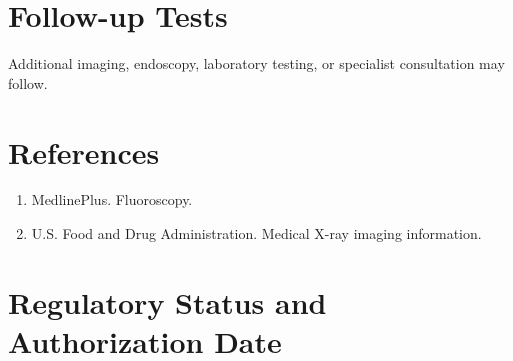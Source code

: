 \section*{Follow-up Tests} Additional imaging, endoscopy, laboratory testing, or specialist consultation may follow.
\section*{References} \begin{enumerate}\item MedlinePlus. Fluoroscopy.\item U.S. Food and Drug Administration. Medical X-ray imaging information.\end{enumerate}
\clearpage\section*{Regulatory Status and Authorization Date}\clearpage
